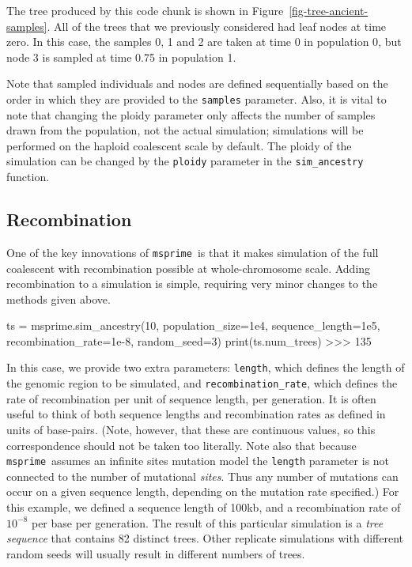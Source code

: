 \documentclass[graybox]{svmult}
\newcommand{\msprime}[0]{\texttt{msprime}}
\begin{document}
The tree produced by this code chunk is shown in Figure~\ref{fig-tree-ancient-samples}.
All of the trees that we previously considered had leaf nodes at time
zero. In this case, the samples 0, 1 and 2 are taken at time 0 in
population 0, but node 3 is sampled at time 0.75 in population 1.

Note that sampled individuals and nodes are defined sequentially based
on the order in which they are provided to the \texttt{samples} parameter. Also, it is vital
to note that changing the ploidy parameter only affects the number of samples drawn from
the population, not the actual simulation; simulations will be performed on the
haploid coalescent scale by default. The ploidy of the simulation can be changed by the
\texttt{ploidy} parameter in the \texttt{sim\_ancestry} function.


\subsection{Recombination}\label{recombination}

One of the key innovations of \msprime\ is that it makes simulation of the
full coalescent with recombination possible at whole-chromosome scale.
Adding recombination to a simulation is simple, requiring very minor
changes to the methods given above.

\begin{pythoncode}
ts = msprime.sim_ancestry(10, population_size=1e4, sequence_length=1e5, recombination_rate=1e-8, random_seed=3)
print(ts.num_trees)
>>> 135
\end{pythoncode}

    In this case, we provide two extra parameters: \texttt{length}, which
defines the length of the genomic region to be simulated, and
\texttt{recombination\_rate}, which defines the rate of recombination
per unit of sequence length, per generation. It is often useful to
think of both sequence lengths and recombination rates as defined in units of base-pairs. (Note, however, that these are continuous values, so this
correspondence should not be taken too literally. Note also that because \msprime\ assumes an infinite sites mutation model
the \texttt{length} parameter is not connected to the number
of mutational \emph{sites}. Thus any number of mutations can occur on a
given sequence length, depending on the mutation rate specified.)
For this example, we
defined a sequence length of 100kb, and a recombination rate of
\(10^{-8}\) per base per generation. The result of this particular simulation is a
\emph{tree sequence} that contains 82 distinct trees. Other replicate
simulations with different random seeds will usually result in different
numbers of trees.
\end{document}
